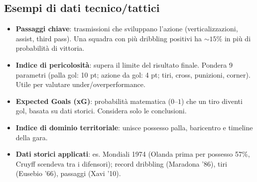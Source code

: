 \documentclass[a4paper,11pt]{article}
\begin{document}
\subsection{Esempi di dati tecnico/tattici}
\begin{itemize}
    \item \textbf{Passaggi chiave}: trasmissioni che sviluppano l'azione (verticalizzazioni, assist, third pass). Una squadra con più dribbling positivi ha $\sim 15\%$ in più di probabilità di vittoria.
    \item \textbf{Indice di pericolosità}: supera il limite del risultato finale. Pondera 9 parametri (palla gol: 10 pt; azione da gol: 4 pt; tiri, cross, punizioni, corner). Utile per valutare under/overperformance.
    \item \textbf{Expected Goals (xG)}: probabilità matematica ($0$--$1$) che un tiro diventi gol, basata su dati storici. Considera solo le conclusioni.
    \item \textbf{Indice di dominio territoriale}: unisce possesso palla, baricentro e timeline della gara.
    \item \textbf{Dati storici applicati}: es. Mondiali 1974 (Olanda prima per possesso 57\%, Cruyff scendeva tra i difensori); record dribbling (Maradona '86), tiri (Eusebio '66), passaggi (Xavi '10).
\end{itemize}
\end{document}
